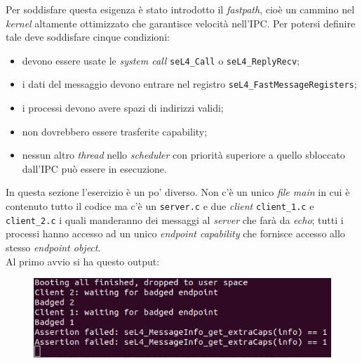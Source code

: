 Per soddisfare questa esigenza è stato introdotto il \textit{fastpath}, cioè un cammino nel \textit{kernel} altamente ottimizzato che garantisce velocità nell'IPC. Per potersi definire tale deve soddisfare cinque condizioni:
\begin{itemize}
	\item devono essere usate le \textit{system call} \texttt{seL4\_Call} o \texttt{seL4\_ReplyRecv};
	\item i dati del messaggio devono entrare nel registro \texttt{seL4\_FastMessageRegisters};
	\item i processi devono avere spazi di indirizzi validi;
	\item non dovrebbero essere trasferite capability;
	\item nessun altro \textit{thread} nello \textit{scheduler} con priorità superiore a quello sbloccato dall'IPC può essere in esecuzione.
\end{itemize}

In questa sezione l'esercizio è un po' diverso. Non c'è un unico \textit{file main} in cui è contenuto tutto il codice ma c'è un \texttt{server.c} e due \textit{client} \texttt{client\_1.c} e \texttt{client\_2.c} i quali manderanno dei messaggi al \textit{server} che farà da \textit{echo}; tutti i processi hanno accesso ad un unico \textit{endpoint capability} che fornisce accesso allo stesso \textit{endpoint object}.\\
Al primo avvio si ha questo output:
\begin{figure}[H]
  \includegraphics[scale=0.7]{img/PrimoAvvioIPC2.png}%
  \centering
  \label{fig:PrimoAvvio}
\end{figure}

